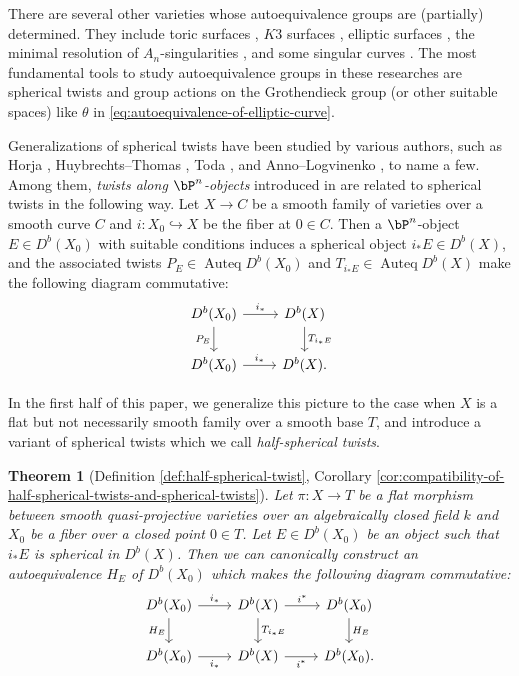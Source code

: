 \documentclass{amsart}
\numberwithin{equation}{section}
\theoremstyle{plain}
\newtheorem{theorem}{Theorem}[section]
\theoremstyle{definition}
\DeclareMathOperator{\Auteq}{\mathrm{Auteq}}
\begin{document}
There are several other varieties whose autoequivalence groups are (partially) determined.
They include toric surfaces \cite{MR3162236}, $K3$ surfaces \cite{MR2553878, MR3592689}, elliptic surfaces \cite{MR3568337}, the minimal resolution of $A_n$-singularities \cite{MR2198807, MR2629510},
and some singular curves \cite{MR2264663, 2020arXiv201108288O}.
The most fundamental tools to study autoequivalence groups in these researches are spherical twists and group actions on the Grothendieck group (or other suitable spaces) like $\theta$ in \eqref{eq:autoequivalence-of-elliptic-curve}.

Generalizations of spherical twists have been studied by various authors,
such as
Horja \cite{MR2126495},
Huybrechts--Thomas \cite{MR2200048},
Toda \cite{MR2430202},
and
Anno--Logvinenko \cite{MR3692883},
to name a few.
Among them, \emph{twists along $\bP^n$-objects} introduced in \cite{MR2200048} are related to spherical twists in the following way.
Let $X \to C$ be a smooth family of varieties over a smooth curve $C$ and $i \colon X_{0} \hookrightarrow X$ be the fiber at $0 \in C$.
Then a $\bP^n$-object $E \in D^b(X_0)$ with suitable conditions induces a spherical object $i_*E \in D^b(X)$,
and the associated twists $P_E \in \Auteq{D^b(X_0)}$ and $T_{i_*E} \in \Auteq{D^b(X)}$ make the following diagram commutative:
\begin{equation} \label{eq:cd}
    \begin{tikzcd}
        D^b(X_0) \arrow[r,"i_*"]\arrow[d, "P_E"'] & D^b(X) \arrow[d,"T_{i_*E}"]\\
        D^b(X_0) \arrow[r, "i_*"]& D^b(X).
    \end{tikzcd}
\end{equation}

In the first half of this paper, we generalize this picture to the case when $X$ is a flat but not necessarily smooth family over a smooth base $T$, and introduce a variant of spherical twists which we call \emph{half-spherical twists}.
\begin{theorem}[Definition \ref{def:half-spherical-twist}, Corollary \ref{cor:compatibility-of-half-spherical-twists-and-spherical-twists}]\label{thm:main-theorem-1-half-spherical-twist}
    Let $\pi \colon X \to T$ be a flat morphism between smooth quasi-projective varieties over an algebraically closed field $k$ and $X_0$ be a fiber over a closed point $0 \in T$.
    Let $E \in D^b(X_0)$ be an object such that $i_*E$ is spherical in $D^b(X)$.
    Then we can canonically construct an autoequivalence $H_E$ of $D^b(X_0)$ which makes the following diagram commutative:
    \begin{equation}\label{eq:half-spherical-twist-commutative-diagram}
        \begin{tikzcd}
            D^b(X_0) \ar[r, "i_*"] \ar[d, "H_E"'] & D^b(X) \ar[r, "i^*"]\ar[d, "T_{i_*E}"] & D^b(X_0) \ar[d,  "H_E"]\\
            D^b(X_0) \ar[r, "i_*"'] & D^b(X) \ar[r, "i^*"'] & D^b(X_0).
        \end{tikzcd}
    \end{equation}
\end{theorem}
\end{document}
